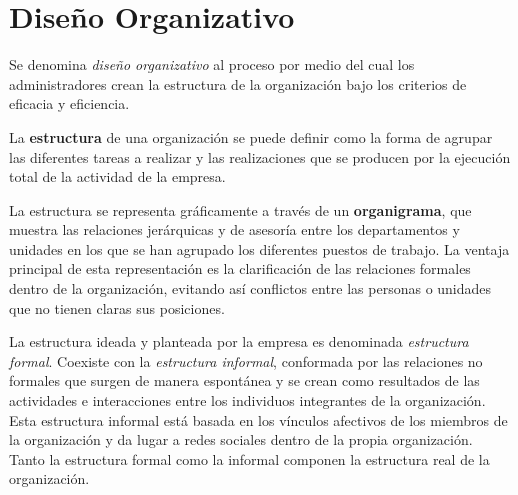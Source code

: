 \documentclass[12pt,a4paper,spanish]{report}
\begin{document}
	\section{\textcolor[rgb]{0.5,0.1,0.4}Diseño Organizativo}
		Se denomina \emph{\textcolor[rgb]{0.5,0.1,0.4}{diseño organizativo}} al proceso por medio del cual los administradores crean la estructura de la organización bajo los criterios de eficacia y eficiencia.

		La \textbf{estructura} de una organización se puede definir como la forma de agrupar las diferentes tareas a realizar y las realizaciones que se producen por la ejecución total de la actividad de la empresa.

		La estructura se representa gráficamente a través de un \textbf{organigrama}, que muestra las relaciones jerárquicas y de asesoría entre los departamentos y unidades en los que se han agrupado los diferentes puestos de trabajo. La ventaja principal de esta representación es la clarificación de las relaciones formales dentro de la organización, evitando así conflictos entre las personas o unidades que no tienen claras sus posiciones.

		La estructura ideada y planteada por la empresa es denominada \textcolor[rgb]{0.5,0.1,0.4}{\emph{estructura formal}}. Coexiste con la \textcolor[rgb]{0.5,0.1,0.4}{\emph{estructura informal}}, conformada por las relaciones no formales que surgen de manera espontánea y se crean como resultados de las actividades e interacciones entre los individuos integrantes de la organización. Esta estructura informal está basada en los vínculos afectivos de los miembros de la organización y da lugar a redes sociales dentro de la propia organización. Tanto la estructura formal como la informal componen la estructura real de la organización.
\end{document}
